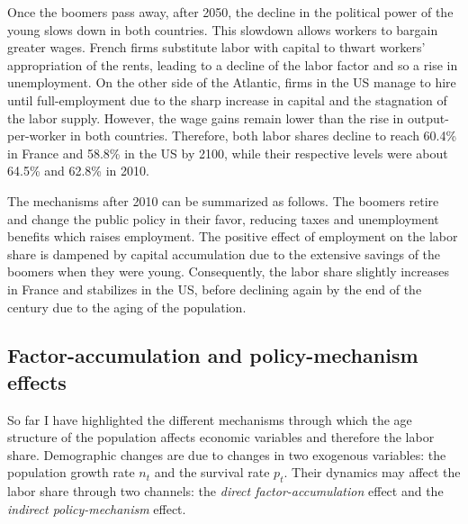 Once the boomers pass away, after 2050, the decline in the political power of the young slows down in both countries. This slowdown allows workers to bargain greater wages. French firms substitute labor with capital to thwart workers' appropriation of the rents, leading to a decline of the labor factor and so a rise in unemployment. On the other side of the Atlantic, firms in the US manage to hire until full-employment due to the sharp increase in capital and the stagnation of the labor supply. However, the wage gains remain lower than the rise in output-per-worker in both countries. Therefore, both labor shares decline to reach 60.4\% in France and 58.8\% in the US by 2100, while their respective levels were about 64.5\% and 62.8\% in 2010.

The mechanisms after 2010 can be summarized as follows. The boomers retire and change the public policy in their favor, reducing taxes and unemployment benefits which raises employment. The positive effect of employment on the labor share is dampened by capital accumulation due to the extensive savings of the boomers when they were young. Consequently, the labor share slightly increases in France and stabilizes in the US, before declining again by the end of the century due to the aging of the population.

\subsection{Factor-accumulation and policy-mechanism effects} \label{chap1-counterfactual}

So far I have highlighted the different mechanisms through which the age structure of the population affects economic variables and therefore the labor share. Demographic changes are due to changes in two exogenous variables: the population growth rate $n_t$ and the survival rate $p_t$. 
Their dynamics may affect the labor share through two channels: the \textit{direct factor-accumulation} effect and the \textit{indirect policy-mechanism} effect.

